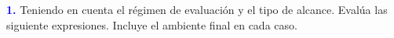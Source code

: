 \textbf{\textcolor{blue}{1.}} Teniendo en cuenta el régimen
de evaluación y el tipo de alcance. Evalúa las siguiente
expresiones. Incluye el ambiente final en cada caso. \newline


